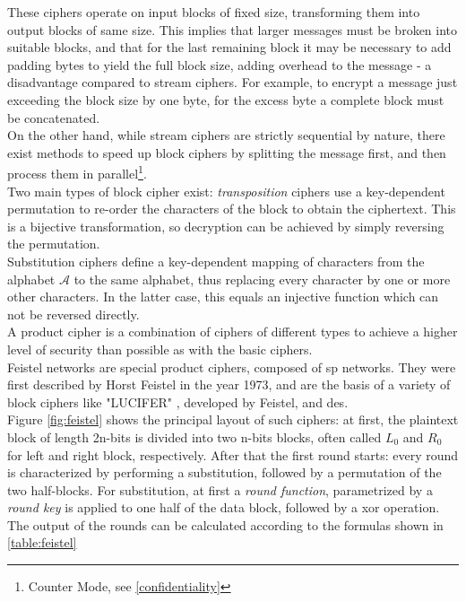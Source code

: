 These ciphers operate on input blocks of fixed size, transforming them into output blocks of same size. This implies that larger messages must be broken into
suitable blocks, and that for the last remaining block it may be necessary to add padding bytes to yield the full block size,
adding overhead to the message - a disadvantage compared to stream ciphers. For example, to encrypt a message just exceeding the block size by one byte,
for the excess byte a complete block must be concatenated. 
\\
On the other hand, while stream ciphers are strictly sequential by nature, there exist methods to speed up block ciphers by splitting the message
first, and then process them in parallel\footnote{Counter Mode, see \ref{confidentiality}}. 
\\
Two main types of block cipher exist: \textit{transposition} ciphers use a key-dependent permutation to re-order the characters of the block to obtain the ciphertext.
This is a bijective transformation, so decryption can be achieved by simply reversing the permutation.
\\
Substitution ciphers define a key-dependent mapping of characters from the alphabet $\mathcal{A}$ to the same alphabet, thus replacing every character by one
or more other characters. In the latter case, this equals an injective function which can not be reversed directly.
\\
A product cipher is a combination of ciphers of different types to achieve a higher level of security than possible as with the basic ciphers. 
\\
Feistel networks are special product ciphers, composed of \gls{sp} networks. They were first described by Horst Feistel in the year 1973\cite{feistel}, and are 
the basis of a variety of block ciphers like "LUCIFER" \cite{feistel1974block,}, developed by Feistel, and \gls{des}.
\\
Figure \ref{fig:feistel} shows the principal layout of such ciphers: at first, the plaintext block of length
2n-bits is divided into two n-bits blocks, often called $L_0$ and $R_0$ for left and right block, respectively. After that the first round starts: every round
is characterized by performing a substitution, followed by a permutation of the two half-blocks. For substitution, at first a \textit{round function},
parametrized by a \textit{round key} is applied to one half of the data block, followed by a \gls{xor} operation. The output of the rounds can be calculated
according to the formulas shown in \ref{table:feistel}
\\
